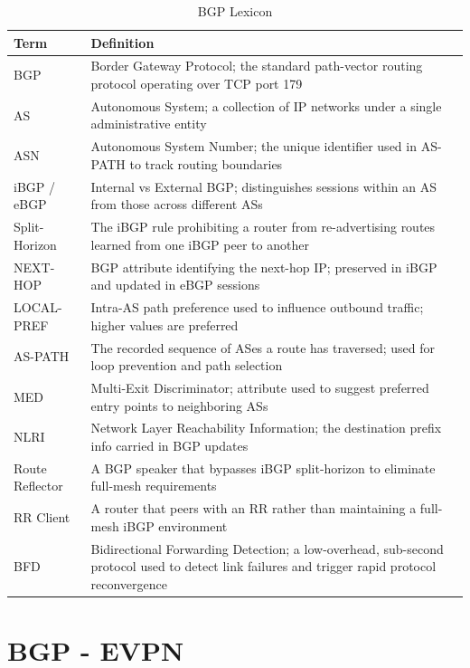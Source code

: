 \begin{table}[!htbp]
\small
\centering
\begin{tabularx}{\textwidth}{@{}l X@{}}
\toprule
\textbf{Term} & \textbf{Definition} \\ \midrule
BGP & Border Gateway Protocol; the standard path-vector routing protocol operating over TCP port 179 \\ \midrule
AS & Autonomous System; a collection of IP networks under a single administrative entity  \\ \midrule
ASN & Autonomous System Number; the unique identifier used in AS-PATH to track routing boundaries \\ \midrule
iBGP / eBGP & Internal vs External BGP; distinguishes sessions within an AS from those across different ASs  \\ \midrule
Split-Horizon & The iBGP rule prohibiting a router from re-advertising routes learned from one iBGP peer to another \\ \midrule
NEXT-HOP & BGP attribute identifying the next-hop IP; preserved in iBGP and updated in eBGP sessions \\ \midrule
LOCAL-PREF & Intra-AS path preference used to influence outbound traffic; higher values are preferred \\ \midrule
AS-PATH & The recorded sequence of ASes a route has traversed; used for loop prevention and path selection \\ \midrule
MED & Multi-Exit Discriminator; attribute used to suggest preferred entry points to neighboring ASs \\ \midrule
NLRI & Network Layer Reachability Information; the destination prefix info carried in BGP updates \\ \midrule
Route Reflector & A BGP speaker that bypasses iBGP split-horizon to eliminate full-mesh requirements \\ \midrule
RR Client & A router that peers with an RR rather than maintaining a full-mesh iBGP environment \\ \midrule
BFD & Bidirectional Forwarding Detection; a low-overhead, sub-second protocol used to detect link failures and trigger rapid protocol reconvergence \\ \bottomrule
\end{tabularx}
\caption{BGP Lexicon}
\label{tab:bgp-lexicon}
\end{table}

\section{BGP - EVPN}
